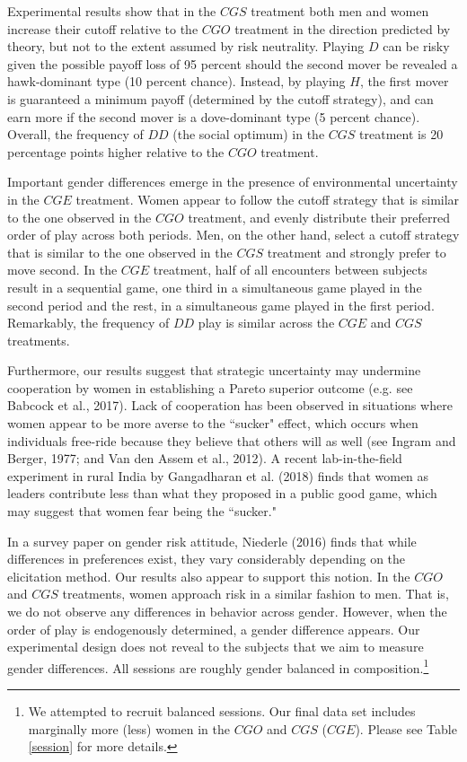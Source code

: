 \documentclass[12pt,english]{article}
\begin{document}
Experimental results show that in the $CGS$ treatment both men and women increase their cutoff relative to the $CGO$ treatment in the direction predicted by theory, but not to the extent assumed by risk neutrality. Playing $D$ can be risky given the possible payoff loss of 95 percent should the second mover be revealed a hawk-dominant type (10 percent chance). Instead, by playing $H$, the first mover is guaranteed a minimum payoff (determined by the cutoff strategy), and can earn more if the second mover is a dove-dominant type (5 percent chance). Overall, the frequency of $DD$ (the social optimum) in the $CGS$ treatment is 20 percentage points higher relative to the $CGO$ treatment. 

 Important gender differences emerge in the presence of environmental uncertainty in the $CGE$ treatment. Women appear to follow the cutoff strategy that is similar to the one observed in the $CGO$ treatment, and evenly distribute their preferred order of play across both periods. Men, on the other hand, select a cutoff strategy that is similar to the one observed in the $CGS$ treatment and strongly prefer to move second. In the $CGE$ treatment, half of all encounters between subjects result in a sequential game, one third in a simultaneous game played in the second period and the rest, in a simultaneous game played in the first period. Remarkably, the frequency of $DD$ play is similar across the $CGE$ and $CGS$ treatments.

Furthermore, our results suggest that strategic uncertainty may undermine cooperation by women in establishing a Pareto superior outcome (e.g. see Babcock et al., 2017). Lack of cooperation has been observed in situations where women appear to be more averse to the ``sucker" effect, which occurs when individuals free-ride because they believe that others will as well (see Ingram and Berger, 1977; and Van den Assem et al., 2012). A recent lab-in-the-field experiment in rural India by Gangadharan et al. (2018) finds that women as leaders contribute less than what they proposed in a public good game, which may suggest that women fear being the ``sucker." 


In a survey paper on gender risk attitude, Niederle (2016) finds that while differences in preferences exist, they vary considerably depending on the elicitation method. Our results also appear to support this notion. In the $CGO$ and $CGS$ treatments, women approach risk in a similar fashion to men. That is, we do not observe any differences in behavior across gender. However, when the order of play is endogenously determined, a gender difference appears. Our experimental design does not reveal to the subjects that we aim to measure gender differences. All sessions are roughly gender balanced in composition.\footnote{We attempted to recruit balanced sessions. Our final data set includes marginally more (less) women in the $CGO$ and $CGS$ ($CGE$). Please see Table \ref{session} for more details.}
\end{document}
